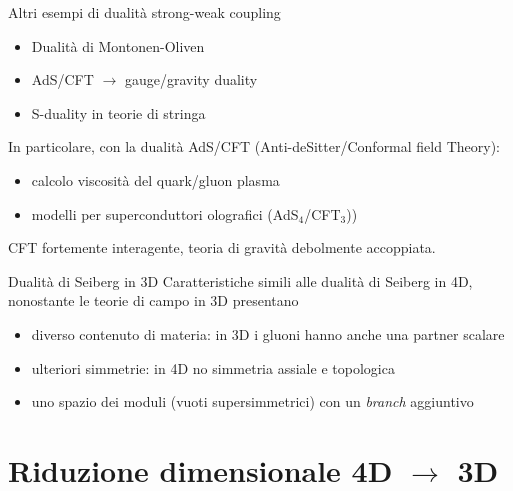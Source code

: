 \documentclass[10pt,compress]{beamer}
\begin{document}
\begin{frame}{Altri esempi di dualità strong-weak coupling}

\begin{itemize}
\item Dualità di Montonen-Oliven
\item AdS/CFT $\rightarrow$ gauge/gravity duality 
\item S-duality in teorie di stringa
\end{itemize}

In particolare, con la dualità AdS/CFT (Anti-deSitter/Conformal field Theory):
\begin{itemize}
\item calcolo viscosità del quark/gluon plasma
\item modelli per superconduttori olografici (AdS$_4$/CFT$_3$))
\end{itemize}

CFT \alert{fortemente} interagente, teoria di gravità \alert{debolmente} accoppiata.

\end{frame}



\begin{frame}{Dualità di Seiberg in 3D}
Caratteristiche simili alle dualità di Seiberg in 4D, nonostante le teorie di campo in 3D presentano
\begin{itemize}
\item diverso contenuto di materia: in 3D i gluoni hanno anche una partner \alert{scalare} 
\item ulteriori simmetrie: in 4D no simmetria \alert{assiale} e \alert{topologica} 
\item uno spazio dei moduli (\alert{vuoti supersimmetrici}) con un \emph{branch} aggiuntivo  
\end{itemize}
\vspace{0,3cm}

\end{frame}

\section{Riduzione dimensionale 4D $ \rightarrow$ 3D}
\end{document}
